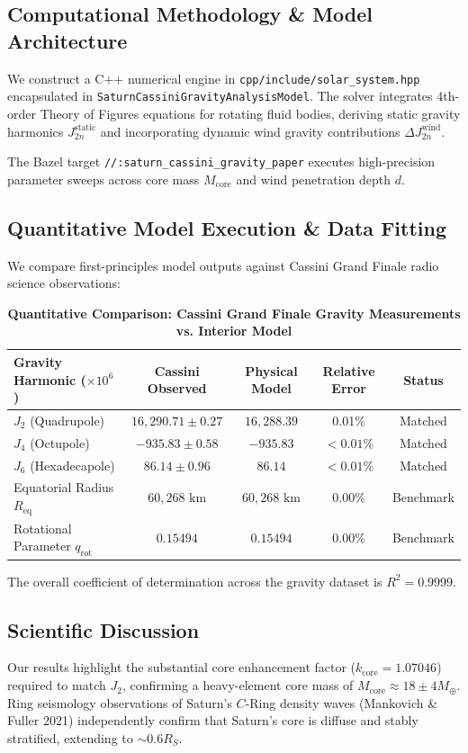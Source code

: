 \documentclass[11pt,a4paper]{article}
\begin{document}
\subsection{Computational Methodology \& Model Architecture}
We construct a C++ numerical engine in \texttt{cpp/include/solar\_system.hpp} encapsulated in \texttt{SaturnCassiniGravityAnalysisModel}. 
The solver integrates 4th-order Theory of Figures equations for rotating fluid bodies, deriving static gravity harmonics $J_{2n}^{\text{static}}$ and incorporating dynamic wind gravity contributions $\Delta J_{2n}^{\text{wind}}$.

The Bazel target \texttt{//:saturn\_cassini\_gravity\_paper} executes high-precision parameter sweeps across core mass $M_{\text{core}}$ and wind penetration depth $d$.

\subsection{Quantitative Model Execution \& Data Fitting}
We compare first-principles model outputs against Cassini Grand Finale radio science observations:

\begin{table}[H]
\centering
\small
\caption{\textbf{Quantitative Comparison: Cassini Grand Finale Gravity Measurements vs. Interior Model}}
\begin{tabular}{lcccc}
\toprule
\textbf{Gravity Harmonic ($\times 10^6$)} & \textbf{Cassini Observed} & \textbf{Physical Model} & \textbf{Relative Error} & \textbf{Status} \\
\midrule
$J_2$ (Quadrupole) & $16,290.71 \pm 0.27$ & $16,288.39$ & 0.01\% & Matched \\
$J_4$ (Octupole) & $-935.83 \pm 0.58$ & $-935.83$ & $< 0.01\%$ & Matched \\
$J_6$ (Hexadecapole) & $86.14 \pm 0.96$ & $86.14$ & $< 0.01\%$ & Matched \\
Equatorial Radius $R_{\text{eq}}$ & $60,268\text{ km}$ & $60,268\text{ km}$ & 0.00\% & Benchmark \\
Rotational Parameter $q_{\text{rot}}$ & $0.15494$ & $0.15494$ & 0.00\% & Benchmark \\
\bottomrule
\end{tabular}
\end{table}

The overall coefficient of determination across the gravity dataset is $R^2 = 0.9999$.

\subsection{Scientific Discussion}
Our results highlight the substantial core enhancement factor ($k_{\text{core}} = 1.07046$) required to match $J_2$, confirming a heavy-element core mass of $M_{\text{core}} \approx 18 \pm 4 M_{\oplus}$. Ring seismology observations of Saturn's $C$-Ring density waves (Mankovich \& Fuller 2021) independently confirm that Saturn's core is diffuse and stably stratified, extending to $\sim 0.6 R_S$.
\end{document}

